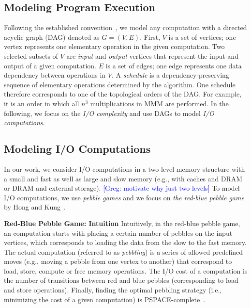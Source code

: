 \documentclass[sigplan,review,anonymous]{acmart}\settopmatter{printfolios=true,printccs=false,printacmref=false}
\newcommand\greg[1]{\textcolor{blue}{[Greg: #1]}}
\newcommand{\macb}[1]{\textbf{\textsf{#1}}}
\begin{document}
\subsection{Modeling Program Execution}


Following the established convention~\cite{completeRegisterProblems,
pebblegameregister, registerpebblecolor}, we model any computation with a
directed acyclic graph (DAG) denoted as $G=(V,E)$. First, $V$ is a set of
vertices; one vertex represents one elementary operation in the given
computation. Two selected subsets of $V$ are \emph{input} and \emph{output}
vertices that represent the input and output of a given computation. $E$ is a
set of edges; one edge represents one data dependency between operations in
$V$.
%
A \emph{schedule} is a dependency-preserving sequence of 
elementary operations determined by the algorithm. One schedule therefore 
corresponds to one of the topological orders of the DAG. For example, it is an 
order 
in which all $n^3$ multiplications in MMM are performed.
%
In the following, we focus on the \emph{I/O complexity} and use DAGs to model
\emph{I/O computations}.

\subsection{Modeling I/O Computations}

%
In our work, we consider I/O computations in a two-level memory structure with
a small and fast as well as large and slow memory (e.g., with caches and DRAM
or DRAM and external storage). \greg{motivate why just two levels}
%
To model I/O computations, we use \emph{pebble games} and we focus on \emph{the
red-blue pebble game} by Hong and Kung~\cite{redblue}.

\macb{Red-Blue Pebble Game: Intuition}
%
Intuitively, in the red-blue pebble game, an computation starts with placing a 
certain
number of pebbles on the input vertices, which corresponds to loading the data
from the slow to the fast memory. The actual computation (referred to as
\emph{pebbling}) is a series of allowed predefined moves (e.g., moving a pebble
from one vertex to another) that correspond to load, store, compute or free 
memory 
operations.
%
The I/O cost of a computation is the number of transitions between
red and blue pebbles (corresponding to load and store operations).
%
Finally, finding the optimal pebbling strategy (i.e., minimizing the cost of a
given computation) is PSPACE-complete~\cite{redbluecomplete,
pebblegameregister}. 
\end{document}
